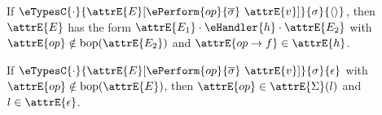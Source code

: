 \begin{lemma}
  \label{lemma:lange-op-handled}

  If $\eTypesC{\cdot}{\attrE{E}[\ePerform{op}{\overline{\sigma}} \ \attrE{v}]}{\sigma}{\langle \rangle}$, then $\attrE{E}$ has the form $\attrE{E_1} \cdot \eHandler{h} \cdot \attrE{E_2}$ with $\attrE{op} \notin \text{bop}(\attrE{E_2})$ and $\attrE{op \to f} \in \attrE{h}$.
\end{lemma}

\begin{lemma}
  \label{lemma:lange-types-meaningful}

  If $\eTypesC{\cdot}{\attrE{E}[\ePerform{op}{\overline{\sigma}} \ \attrE{v}]}{\sigma}{\epsilon}$ with $\attrE{op} \notin \text{bop}(\attrE{E})$, then $\attrE{op} \in \attrE{\Sigma}(l)$ and $l \in \attrE{\epsilon}$.
\end{lemma}

